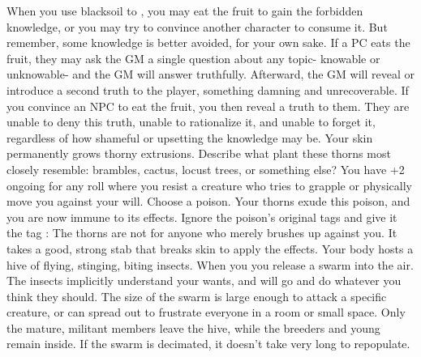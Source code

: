 \documentclass[darkmode]{dw_playbook}
\begin{document}
\pageThree
    {
        \advancedMovesCont
    }
    {
            {When you use blacksoil to , you may eat the fruit to gain the forbidden knowledge, or you may try to convince another character to consume it.  But remember, some knowledge is better avoided, for your own sake.
            \gap
            If a PC eats the fruit, they may ask the GM a single question about any topic- knowable or unknowable- and the GM will answer truthfully.  Afterward, the GM will reveal or introduce a second truth to the player, something damning and unrecoverable.
            \gap
            If you convince an NPC to eat the fruit, you then reveal a truth to them.  They are unable to deny this truth, unable to rationalize it, and unable to forget it, regardless of how shameful or upsetting the knowledge may be.}
        \gap
            {
            \gapSm
            Your skin permanently grows thorny extrusions.  Describe what plant these thorns most closely resemble: brambles, cactus, locust trees, or something else?  You have +2 ongoing for any roll where you resist a creature who tries to grapple or physically move you against your will.
            \gap
            Choose a poison.  Your thorns exude this poison, and you are now immune to its effects.  Ignore the poison's original tags and give it the tag :  The thorns are not  for anyone who merely brushes up against you.  It takes a good, strong stab that breaks skin to apply the effects.}
            {
            \gapSm
            Your body hosts a hive of flying, stinging, biting insects. When you  you release a swarm into the air.  The insects implicitly understand your wants, and will go and do whatever you think they should.  The size of the swarm is large enough to attack a specific creature, or can spread out to frustrate everyone in a room or small space.  Only the mature, militant members leave the hive, while the breeders and young remain inside.  If the swarm is decimated, it doesn’t take very long to repopulate.
            \gap
}}
\end{document}
